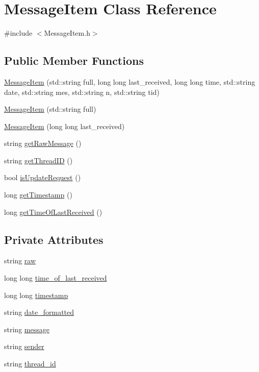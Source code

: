 \hypertarget{classMessageItem}{\section{Message\+Item Class Reference}
\label{classMessageItem}
}


{\ttfamily \#include $<$Message\+Item.\+h$>$}

\subsection*{Public Member Functions}
\begin{DoxyCompactItemize}
\item 
\hyperlink{classMessageItem_accd78c22168301a5422b5ec62a90cbf9}{Message\+Item} (std\+::string full, long long last\+\_\+received, long long time, std\+::string date, std\+::string mes, std\+::string n, std\+::string tid)
\item 
\hyperlink{classMessageItem_a481f0c466ae0abcb9d3eed5609c67a5e}{Message\+Item} (std\+::string full)
\item 
\hyperlink{classMessageItem_a3f3afd7d1617afc361675c336668275a}{Message\+Item} (long long last\+\_\+received)
\item 
string \hyperlink{classMessageItem_a2bc13b2fee5734dc10d89a2d9c07efc5}{get\+Raw\+Message} ()
\item 
string \hyperlink{classMessageItem_a1cd3dde8f672820b499a2dd80668c342}{get\+Thread\+I\+D} ()
\item 
bool \hyperlink{classMessageItem_aef2ba3ba15cc75712c3a1d2364483055}{is\+Update\+Request} ()
\item 
long \hyperlink{classMessageItem_a5229529c0b5b5b0b8a2965df94b0ea82}{get\+Timestamp} ()
\item 
long \hyperlink{classMessageItem_ae209fcbf309601530d8e284280ec45bf}{get\+Time\+Of\+Last\+Received} ()
\end{DoxyCompactItemize}
\subsection*{Private Attributes}
\begin{DoxyCompactItemize}
\item 
string \hyperlink{classMessageItem_ac11e995b8f4962aff653f1ca25507ddc}{raw}
\item 
long long \hyperlink{classMessageItem_a073585e6e50c6074f1f9aa41b866a2d6}{time\+\_\+of\+\_\+last\+\_\+received}
\item 
long long \hyperlink{classMessageItem_a4f9fcf97f987eb78bcf290f7acf8c8ac}{timestamp}
\item 
string \hyperlink{classMessageItem_a4e238041aeaf8ab88b340fc8dd080ced}{date\+\_\+formatted}
\item 
string \hyperlink{classMessageItem_a0431971aeaf5a0555b8165e66049631b}{message}
\item 
string \hyperlink{classMessageItem_afb790d4667b4a08a232238aef00b7a76}{sender}
\item 
string \hyperlink{classMessageItem_acf5579e8d79d606871030947475d8a3f}{thread\+\_\+id}
\end{DoxyCompactItemize}


